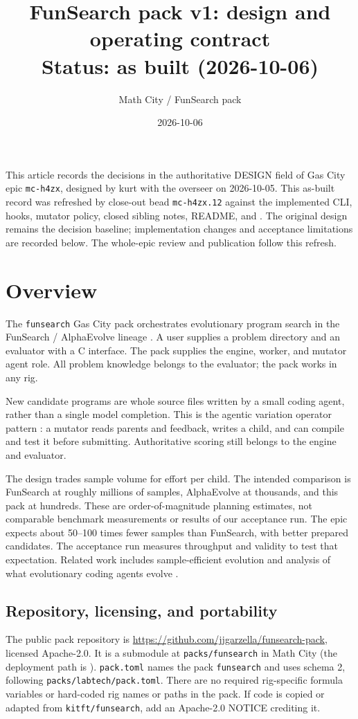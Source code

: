 \documentclass[11pt]{article}
\title{FunSearch pack v1: design and operating contract\\[0.5em]
  \large Status: as built (2026-10-06)}
\author{Math City / FunSearch pack}
\date{2026-10-06}
\newcommand{\code}[1]{\texttt{#1}}
\begin{document}
\maketitle
\noindent This article records the decisions in the authoritative DESIGN field of
Gas City epic \code{mc-h4zx}, designed by kurt with the overseer on 2026-10-05.
This as-built record was refreshed by close-out bead \code{mc-h4zx.12} against
the implemented CLI, hooks, mutator policy, closed sibling notes, README, and
. The original design remains the decision
baseline; implementation changes and acceptance limitations are recorded below.
The whole-epic review and publication follow this refresh.
\tableofcontents

\section{Overview}
The \code{funsearch} Gas City pack orchestrates evolutionary program search in the
FunSearch / AlphaEvolve lineage \cite{funsearch,alphaevolve,ellenberg,kitft}.
A user supplies a problem directory and an evaluator with a C interface.
The pack supplies the engine, worker, and mutator agent role. All problem
knowledge belongs to the evaluator; the pack works in any rig.

New candidate programs are whole source files written by a small coding agent,
rather than a single model completion. This is the agentic variation operator
pattern \cite{avo}: a mutator reads parents and feedback, writes a child,
and can compile and test it before submitting. Authoritative scoring still
belongs to the engine and evaluator.

The design trades sample volume for effort per child. The intended comparison
is FunSearch at roughly millions of samples, AlphaEvolve at thousands, and this
pack at hundreds. These are order-of-magnitude planning estimates, not comparable
benchmark measurements or results of our acceptance run. The epic expects about
50--100 times fewer samples than FunSearch, with better prepared candidates.
The acceptance run measures throughput and validity to test that expectation.
Related work includes sample-efficient evolution \cite{shinka} and analysis of
what evolutionary coding agents evolve \cite{agents-evolve}.

\subsection{Repository, licensing, and portability}
The public pack repository is \url{https://github.com/jjgarzella/funsearch-pack},
licensed Apache-2.0. It is a submodule at \code{packs/funsearch} in Math City
(the deployment path is
).
\code{pack.toml} names the pack \code{funsearch} and uses schema 2, following
\code{packs/labtech/pack.toml}. There are no required rig-specific formula
variables or hard-coded rig names or paths in the pack. If code is copied or
adapted from \code{kitft/funsearch}, add an Apache-2.0 NOTICE crediting it.
\end{document}
